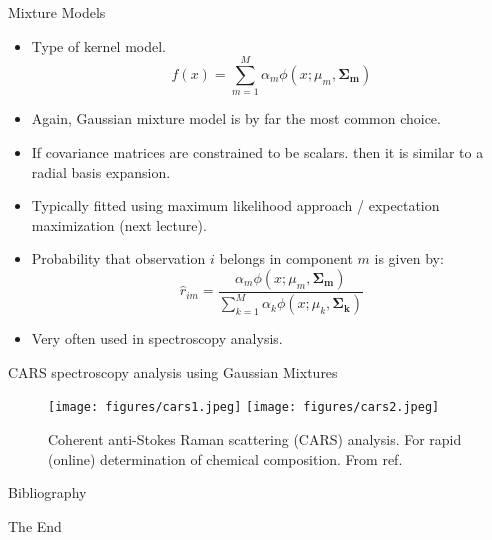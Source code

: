 \documentclass[aspectratio=169]{beamer}
\let \vec \mathbf
\begin{document}
\begin{frame}{Mixture Models}
    \begin{itemize}
        \item Type of kernel model.
        \begin{equation*}
            f(x) = \sum_{m=1}^M \alpha_m \phi(x; \mu_m, \vec{\Sigma_m})
        \end{equation*}
        \item Again, Gaussian mixture model is by far the most common choice.
        \item If covariance matrices are constrained to be scalars. then it is similar to a radial basis expansion.
        \item Typically fitted using maximum likelihood approach / expectation maximization (next lecture).
        \item Probability that observation $i$ belongs in component $m$ is given by:
        \begin{equation*}
            \hat{r}_{im} = \frac{\alpha_m \phi(x; \mu_m, \vec{\Sigma_m})}{\sum_{k=1}^M \alpha_k \phi(x; \mu_k, \vec{\Sigma_k})}
        \end{equation*}
        \item Very often used in spectroscopy analysis.
    \end{itemize}
\end{frame}


\begin{frame}{CARS spectroscopy analysis using Gaussian Mixtures}
\begin{figure}
    \centering
    \texttt{[image: figures/cars1.jpeg]}
    \texttt{[image: figures/cars2.jpeg]}
    \caption{Coherent anti-Stokes Raman scattering (CARS) analysis. For rapid (online) determination of chemical composition. From ref. \cite{voglerSeparationCARSImage2010}}
\end{figure}
\end{frame}


\begin{frame}{Bibliography}
    
    
\end{frame}




\begin{frame}
    \Huge{\centerline{The End}}
\end{frame}
\end{document}
